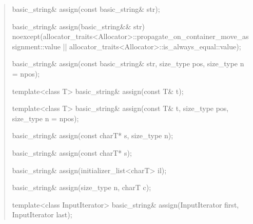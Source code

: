 \documentclass{wg21}
\begin{document}
\begin{quote}
\begin{itemdecl}
basic_string& assign(const basic_string& str);
\end{itemdecl}

\begin{itemdecl}
basic_string& assign(basic_string&& str)
  noexcept(allocator_traits<Allocator>::propagate_on_container_move_assignment::value ||
           allocator_traits<Allocator>::is_always_equal::value);
\end{itemdecl}

\begin{itemdecl}
basic_string& assign(const basic_string& str, size_type pos, size_type n = npos);
\end{itemdecl}

\begin{itemdecl}
template<class T>
  basic_string& assign(const T& t);
\end{itemdecl}

\begin{itemdecl}
template<class T>
  basic_string& assign(const T& t, size_type pos, size_type n = npos);
\end{itemdecl}

\begin{itemdecl}
basic_string& assign(const charT* s, size_type n);
\end{itemdecl}

\begin{itemdecl}
basic_string& assign(const charT* s);
\end{itemdecl}

\begin{itemdecl}
basic_string& assign(initializer_list<charT> il);
\end{itemdecl}

\begin{itemdecl}
basic_string& assign(size_type n, charT c);
\end{itemdecl}

\begin{itemdecl}
template<class InputIterator>
  basic_string& assign(InputIterator first, InputIterator last);
\end{itemdecl}
\end{quote}
\end{document}
